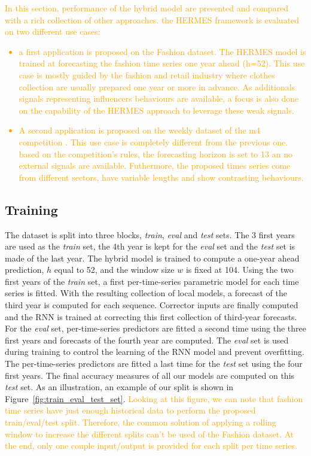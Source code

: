 \documentclass[10pt]{article} %
\newcommand{\lag}{h}
\newcommand{\window}{w}
\begin{document}
\textcolor{orange}{In this section, performance of the hybrid model are presented and compared with a rich collection of other approaches. the HERMES framework is evaluated on two different use cases:
\begin{itemize}
	\item a first application is proposed on the Fashion dataset. The HERMES model is trained at forecasting the fashion time series one year ahead (h=52). This use case is mostly guided by the fashion and retail industry where clothes collection are usually prepared one year or more in advance. As additionals signals representing influencers behaviours are available, a focus is also done on the capability of the HERMES approach to leverage these weak signals.
	\item A second application is proposed on the weekly dataset of the m4 competition \citep{makridakis2018}. This use case is completely different from the previous one. based on the competition's rules, the forecasting horizon is set to 13 an no external signals are available. Futhermore, the proposed times series come from different sectors, have variable lengths and show contrasting behaviours.
\end{itemize}
}

\subsection{Training}
The dataset is split into three blocks, {\em train}, {\em eval} and {\em test} sets. The 3 first years are used as the {\em train} set, the 4th year is kept for the {\em eval} set and the {\em test} set is made of the last year. The hybrid model is trained to compute a one-year ahead prediction, $\lag$ equal to 52, and the window size $\window$ is fixed at 104.
Using the two first years of the {\em train} set, a first per-time-series parametric model for each time series is fitted. With the resulting collection of local models, a forecast of the third year is computed for each sequence. Corrector inputs are finally computed and the RNN is trained at correcting this first collection of third-year forecasts. For the {\em eval} set, per-time-series predictors are fitted a second time using the three first years and forecasts of the fourth year are computed. The {\em eval} set is used during  training to control the learning of the RNN model and prevent overfitting. The per-time-series predictors are fitted a last time for the {\em test} set using the four first years. The final accuracy measures of all our models are computed on this {\em test} set. As an illustration, an example of our split is shown in Figure~\ref{fig:train_eval_test_set}. \textcolor{orange}{Looking at this figure, we can note that fashion time series have just enough historical data to perform the proposed train/eval/test split. Therefore, the common solution of applying a rolling window to increase the different splits can't be used of the Fashion dataset. At the end, only one couple input/output is provided for each split per time series.}
\end{document}
